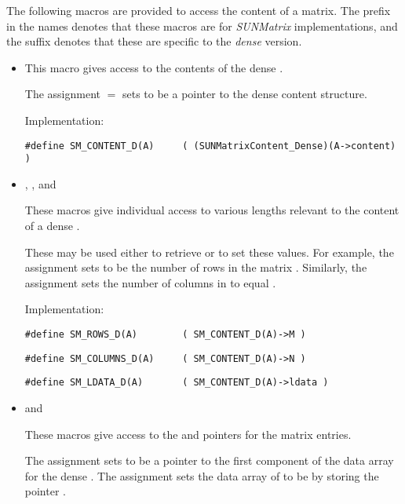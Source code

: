 The following macros are provided to access the
content of a {\sunmatdense} matrix. The prefix  in the names
denotes that these macros are for \emph{SUNMatrix} implementations,
and the suffix  denotes that these are specific to
the \emph{dense} version.
\begin{itemize}

\item {}
    
  This macro gives access to the contents of the
  dense .
  
  The assignment  $=$  sets
   to be a pointer to the dense  content  
  structure.                                             
                                                            
  Implementation: 
  
  \verb|#define SM_CONTENT_D(A)     ( (SUNMatrixContent_Dense)(A->content) )|
  
\item {}, , and 

  These macros give individual access to various lengths relevant to the
  content of a dense .                        
                                                               
  These may be used either to retrieve or to set these values.  For
  example, the assignment  sets  to be
  the number of rows in the matrix .  Similarly, the
  assignment  sets the number of
  columns in  to equal .
  
  Implementation: 

  \verb|#define SM_ROWS_D(A)        ( SM_CONTENT_D(A)->M )|

  \verb|#define SM_COLUMNS_D(A)     ( SM_CONTENT_D(A)->N )|

  \verb|#define SM_LDATA_D(A)       ( SM_CONTENT_D(A)->ldata )|

\item {} and 
                                                            
  These macros give access to the  and  pointers for
  the matrix entries.

  The assignment  sets  to be     
  a pointer to the first component of the data array for the dense
   .  The assignment 
  sets the data array of  to be  by storing the
  pointer .
  

\end{itemize}
